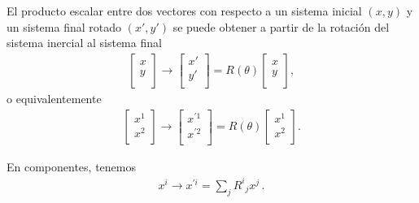 El producto escalar entre dos vectores con respecto a un sistema inicial $(x,y)$  y un sistema final rotado  $(x', y')$ se puede obtener a partir de la rotación del sistema inercial al sistema final
\begin{align}
\begin{bmatrix}
    x\\
    y\\
  \end{bmatrix} \to  \begin{bmatrix}
    x'\\
    y'\\
  \end{bmatrix}=R(\theta)  \begin{bmatrix}
    x\\
    y\\
  \end{bmatrix} ,
\end{align}
o equivalentemente 
\begin{align}
\begin{bmatrix}
    x^1\\
    x^2\\
  \end{bmatrix}\to  \begin{bmatrix}
    x^{\prime 1}\\
    x ^{\prime 2} \\
  \end{bmatrix}=R(\theta)  \begin{bmatrix}
    x^1\\
    x^2\\
  \end{bmatrix}.
\end{align}

En componentes, tenemos
\begin{align}
  \label{eq:rso2}
  x^i\to x^{\prime i}=\sum_j{R^i}_j x^j\,.
\end{align}

